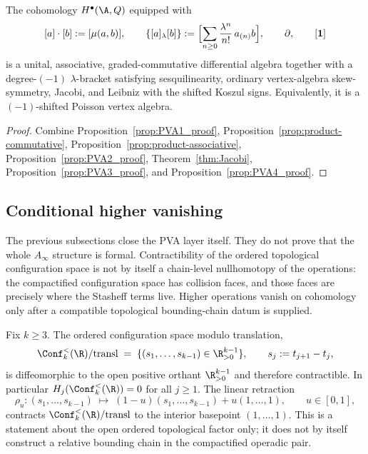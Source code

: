 \begin{corollary}
\label{cor:PVA-structure}
The cohomology $H^\bullet(\A,Q)$ equipped with
\[
[a]\cdot[b]:=[\mu(a,b)],
\qquad
\{[a]_\lambda[b]\}:=\Bigl[\sum_{n\ge0}\frac{\lambda^n}{n!}\,a_{(n)}b\Bigr],
\qquad
\partial,
\qquad
[\mathbf 1]
\]
is a unital, associative, graded-commutative differential algebra together with a
degree-$(-1)$ $\lambda$-bracket satisfying sesquilinearity, ordinary
vertex-algebra skew-symmetry, Jacobi, and Leibniz with the shifted
Koszul signs. Equivalently, it is a $(-1)$-shifted Poisson vertex algebra.
\end{corollary}

\begin{proof}
Combine Proposition~\ref{prop:PVA1_proof},
Proposition~\ref{prop:product-commutative},
Proposition~\ref{prop:product-associative},
Proposition~\ref{prop:PVA2_proof},
Theorem~\ref{thm:Jacobi},
Proposition~\ref{prop:PVA3_proof},
and Proposition~\ref{prop:PVA4_proof}.
\end{proof}

\subsection{Conditional higher vanishing}

The previous subsections close the PVA layer itself. They do not
prove that the whole $A_\infty$ structure is formal. Contractibility
of the ordered topological configuration space is not by itself a
chain-level nullhomotopy of the operations: the compactified
configuration space has collision faces, and those faces are precisely
where the Stasheff terms live. Higher operations vanish on cohomology
only after a compatible topological bounding-chain datum is supplied.

\begin{lemma}
\label{lem:topological-contraction}
Fix $k\ge3$. The ordered configuration space modulo translation,
\[
\Conf_k^{<}(\R)/\mathrm{transl}
\;=\;
\{(s_1,\ldots,s_{k-1})\in\R^{k-1}_{>0}\},
\qquad
s_j:=t_{j+1}-t_j,
\]
is diffeomorphic to the open positive orthant $\R^{k-1}_{>0}$ and therefore contractible.
In particular $H_j(\Conf_k^{<}(\R))=0$ for all $j\ge1$. The linear retraction
\begin{equation}
\label{eq:affine-retraction}
\rho_u\colon (s_1,\ldots,s_{k-1})\;\longmapsto\;
(1-u)(s_1,\ldots,s_{k-1})+u(1,\ldots,1),
\qquad u\in[0,1],
\end{equation}
contracts $\Conf_k^{<}(\R)/\mathrm{transl}$ to the interior basepoint
$(1,\ldots,1)$.
This is a statement about the open ordered topological factor only; it
does not by itself construct a relative bounding chain in the
compactified operadic pair.
\end{lemma}

